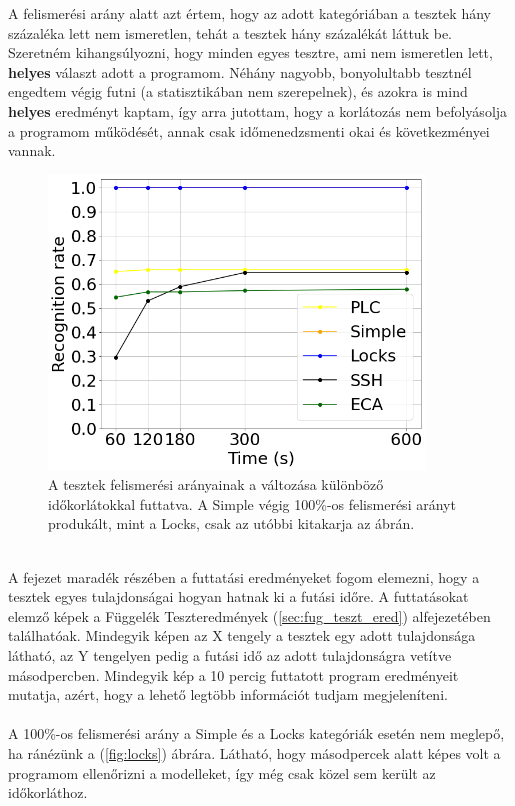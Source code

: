 A felismerési arány alatt azt értem, hogy az adott kategóriában a tesztek hány százaléka lett nem ismeretlen, tehát a tesztek hány százalékát láttuk be. Szeretném kihangsúlyozni, hogy minden egyes tesztre, ami nem ismeretlen lett, \textbf{helyes} választ adott a programom. Néhány nagyobb, bonyolultabb tesztnél engedtem végig futni (a statisztikában nem szerepelnek), és azokra is mind \textbf{helyes} eredményt kaptam, így arra jutottam, hogy a korlátozás nem befolyásolja a programom működését, annak csak időmenedzsmenti okai és következményei vannak.
\\
\begin{figure}[!ht]
	\centering
	\includegraphics[width=100mm, keepaspectratio]{figures/fig_rec_rate_during_time.png}
	\caption{A tesztek felismerési arányainak a változása különböző időkorlátokkal futtatva. A Simple végig 100\%-os felismerési arányt produkált, mint a Locks, csak az utóbbi kitakarja az ábrán.}
	\label{fig:rec_rate_during_time}
\end{figure}
\ \\
A fejezet maradék részében a futtatási eredményeket fogom elemezni, hogy a tesztek egyes tulajdonságai hogyan hatnak ki a futási időre. A futtatásokat elemző képek a Függelék Teszteredmények (\ref{sec:fug_teszt_ered}) alfejezetében találhatóak. Mindegyik képen az X tengely a tesztek egy adott tulajdonsága látható, az Y tengelyen pedig a futási idő az adott tulajdonságra vetítve másodpercben. Mindegyik kép a 10 percig futtatott program eredményeit mutatja, azért, hogy a lehető legtöbb információt tudjam megjeleníteni.
\\
\\
A 100\%-os felismerési arány a Simple és a Locks kategóriák esetén nem meglepő, ha ránézünk a (\ref{fig:locks}) ábrára. Látható, hogy másodpercek alatt képes volt a programom ellenőrizni a modelleket, így még csak közel sem került az időkorláthoz.

